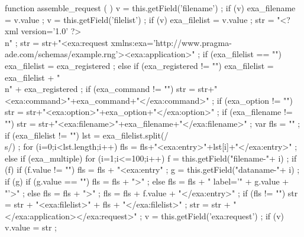     function assemble_request ( ) {
        v = this.getField('filename') ;
        if (v) {
            exa_filename = v.value ;
        }
        v = this.getField('filelist') ;
        if (v) {
            exa_filelist = v.value ;
        }
        str = "<?xml version='1.0' ?>\\n" ;
        str = str+"<exa:request xmlns:exa='http://www.pragma-ade.com/schemas/example.rng'><exa:application>" ;
        if (exa_filelist == "") {
            exa_filelist = exa_registered ;
        } else { if (exa_registered != "") {
            exa_filelist = exa_filelist + "\\n" + exa_registered ;
        } }
        if (exa_command != "") {
            str = str+"<exa:command>"+exa_command+"</exa:command>" ;
        }
        if (exa_option != "") {
            str = str+"<exa:option>"+exa_option+"</exa:option>" ;
        }
        if (exa_filename != "") {
            str = str+"<exa:filename>"+exa_filename+"</exa:filename>" ;
        }
        var fls = "" ;
        if (exa_filelist != "") {
            lst = exa_filelist.split(/\\s/) ;
            for (i=0;i<lst.length;i++) {
                fls = fls+"<exa:entry>"+lst[i]+"</exa:entry>" ;
            }
        } else { if (exa_multiple) {
            for (i=1;i<=100;i++) {
                f = this.getField("filename-"+ i) ;
                if (f) { if (f.value != "") {
                    fls = fls + "<exa:entry" ;
                    g = this.getField("dataname-"+ i) ;
                    if (g) { if (g.value == "") {
                        fls = fls + ">" ;
                    } else {
                        fls = fls + " label='" + g.value + "'>" ;
                    } } else {
                        fls = fls + ">" ;
                    }
                    fls = fls + f.value + "</exa:entry>" ;
                } }
            }
        } }
        if (fls != "") {
            str = str + "<exa:filelist>" + fls + "</exa:filelist>" ;
        }
        str = str + "</exa:application></exa:request>" ;
        v = this.getField('exa:request') ;
        if (v) {
            v.value = str ;
        }
    }


